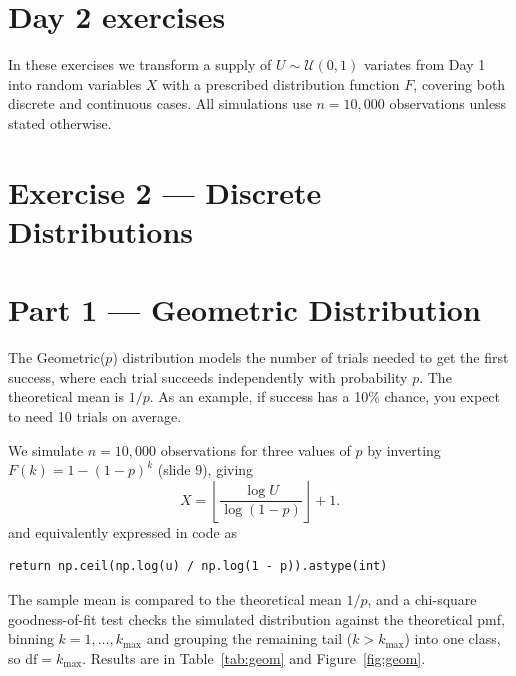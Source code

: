 \newpage
\section*{Day 2 exercises}

In these exercises we transform a supply of $U \sim \mathcal{U}(0,1)$
variates from Day 1 into random variables $X$ with a prescribed distribution
function $F$, covering both discrete and continuous cases.
All simulations use $n = 10{,}000$ observations unless stated otherwise.

\section*{Exercise 2 --- Discrete Distributions}

\section*{Part 1 --- Geometric Distribution}

The Geometric($p$) distribution models the number of trials needed to get
the first success, where each trial succeeds independently with probability
$p$. The theoretical mean is $1/p$. As an example, if success has a 10\% chance, you
expect to need 10 trials on average.

We simulate $n = 10{,}000$ observations for three values of $p$ by inverting
$F(k) = 1-(1-p)^k$ (slide 9), giving
\begin{equation}
    X = \left\lfloor \frac{\log U}{\log(1-p)} \right\rfloor + 1.
    \label{eq:geom}
\end{equation}
and equivalently expressed in code as
\begin{verbatim}
return np.ceil(np.log(u) / np.log(1 - p)).astype(int)
\end{verbatim}
The sample mean is compared to the theoretical mean $1/p$, and a
chi-square goodness-of-fit test checks the simulated distribution against the
theoretical pmf, binning $k = 1, \ldots, k_{\max}$ and grouping the remaining
tail ($k > k_{\max}$) into one class, so $\mathrm{df} = k_{\max}$. Results are
in Table~\ref{tab:geom} and Figure~\ref{fig:geom}.

